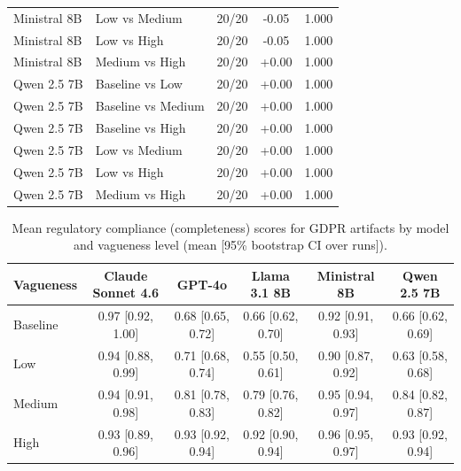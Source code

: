 \begin{table}[t]
\begin{tabular}{llccc}
    Ministral 8B & Low vs Medium & 20/20 & -0.05 & 1.000 \\
    Ministral 8B & Low vs High & 20/20 & -0.05 & 1.000 \\
    Ministral 8B & Medium vs High & 20/20 & +0.00 & 1.000 \\
    Qwen 2.5 7B & Baseline vs Low & 20/20 & +0.00 & 1.000 \\
    Qwen 2.5 7B & Baseline vs Medium & 20/20 & +0.00 & 1.000 \\
    Qwen 2.5 7B & Baseline vs High & 20/20 & +0.00 & 1.000 \\
    Qwen 2.5 7B & Low vs Medium & 20/20 & +0.00 & 1.000 \\
    Qwen 2.5 7B & Low vs High & 20/20 & +0.00 & 1.000 \\
    Qwen 2.5 7B & Medium vs High & 20/20 & +0.00 & 1.000 \\
    \bottomrule
  \end{tabular}
\end{table}

\begin{table}[t]
  \centering
  \caption{Mean regulatory compliance (completeness) scores for GDPR artifacts by model and vagueness level (mean [95\% bootstrap CI over runs]).}
  \label{tab:gdpr_completeness}
  \begin{tabular}{lccccc}
    \toprule
    Vagueness & Claude Sonnet 4.6 & GPT-4o & Llama 3.1 8B & Ministral 8B & Qwen 2.5 7B \\
    \midrule
    Baseline & 0.97 {\scriptsize [0.92, 1.00]} & 0.68 {\scriptsize [0.65, 0.72]} & 0.66 {\scriptsize [0.62, 0.70]} & 0.92 {\scriptsize [0.91, 0.93]} & 0.66 {\scriptsize [0.62, 0.69]} \\
    Low & 0.94 {\scriptsize [0.88, 0.99]} & 0.71 {\scriptsize [0.68, 0.74]} & 0.55 {\scriptsize [0.50, 0.61]} & 0.90 {\scriptsize [0.87, 0.92]} & 0.63 {\scriptsize [0.58, 0.68]} \\
    Medium & 0.94 {\scriptsize [0.91, 0.98]} & 0.81 {\scriptsize [0.78, 0.83]} & 0.79 {\scriptsize [0.76, 0.82]} & 0.95 {\scriptsize [0.94, 0.97]} & 0.84 {\scriptsize [0.82, 0.87]} \\
    High & 0.93 {\scriptsize [0.89, 0.96]} & 0.93 {\scriptsize [0.92, 0.94]} & 0.92 {\scriptsize [0.90, 0.94]} & 0.96 {\scriptsize [0.95, 0.97]} & 0.93 {\scriptsize [0.92, 0.94]} \\
    \bottomrule
  \end{tabular}
\end{table}

